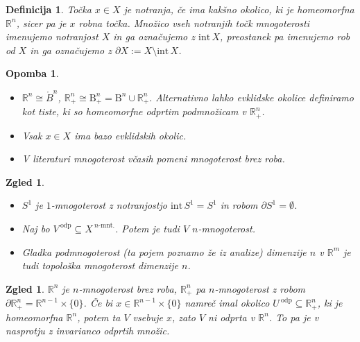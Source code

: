 \documentclass[10pt, a4paper]{article}
\newtheorem{defi}[izr]{Definicija}
\newenvironment{noticeB}{%
  \tcolorbox[%
  notitle,
  empty,
  enhanced,  %
  breakable,
  coltext=black,
  colback=white, 
  fontupper=\rmfamily,
  parbox=false,
  noparskip,
  sharp corners,
  boxrule=-1pt,  %
  frame hidden,
  left=7pt,  %
  right=7pt,
  top=5pt,
  bottom=5pt,
  before skip=2.5ex plus 2pt,
  after skip=2.5ex plus 2pt,
  borderline west = {1.5pt}{-0.1pt}{blue!30!black}, %
  overlay unbroken and last={%
    \draw[color=black, line width=1.25pt]
    ($(frame.south west)+(1.pt, -0.1pt)$) -- ++(2em, 0);
  }
  ]}
{\endtcolorbox}
\newenvironment{definicija}{\begin{defi}\begin{noticeB}}{%
    \end{noticeB}\end{defi}}
\newtheorem*{opomba}{Opomba}
\newtheorem{zgled}[izr]{Zgled}
\newcommand{\R}{\mathbb {R}}
\newcommand{\intem}{\mathrm{int}\,}
\begin{document}
\begin{definicija}
  Točka $x \in X$ je notranja, če ima kakšno okolico, ki je homeomorfna $\R^n$,
  sicer pa je $x$ robna točka. Množico vseh notranjih točk mnogoterosti 
  imenujemo notranjost $X$ in ga označujemo z $\intem X$, preostanek pa imenujemo rob od $X$
  in ga označujemo z $\partial X := X \setminus \intem X$. 
\end{definicija}

\begin{opomba}
  \begin{itemize}
    \item $\R^n \cong \mathring{B}^n$, $\R^n_+ \cong \mathrm{B}^n_+ = \mathrm{B}^n \cup \R^n _+.$
    Alternativno lahko evklidske okolice definiramo kot tiste, ki so homeomorfne odprtim podmnožicam v $\R^n_+$.
    \item Vsak $x \in X$ ima bazo evklidskih okolic.
    \item V literaturi mnogoterost včasih pomeni mnogoterost brez roba.
  \end{itemize}
\end{opomba}

\begin{zgled}
  \begin{itemize}
    \item $S^1$ je $1$-mnogoterost z notranjostjo $\intem S^1 = S^1$ in robom $\partial S^1 = \emptyset$.
    \item Naj bo $V^{\ \text{odp}} \subseteq X^{\ \text{$n$-mnt.}}$. Potem je tudi $V$ $n$-mnogoterost.
    \item Gladka podmnogoterost (ta pojem poznamo že iz analize) dimenzije $n$ v $\R^m$ je tudi topološka 
    mnogoterost dimenzije $n$.
  \end{itemize}
\end{zgled}

\begin{zgled}
$\R^n$ je $n$-mnogoterost brez roba, $\R^n_+$ pa $n$-mnogoterost z robom $\partial \R^n_+ = \R^{n - 1} \times \{0\}$.
    Če bi $x \in \R^{n - 1} \times \{0\}$ namreč imal okolico $U^{\ \text{odp}}\subseteq \R^n_+$, ki je homeomorfna $\R^n$,
    potem ta $V$ vsebuje $x$, zato $V$ ni odprta v $\R^n$. To pa je v nasprotju z invarianco odprtih množic.  
\end{zgled}
  
\end{document}
